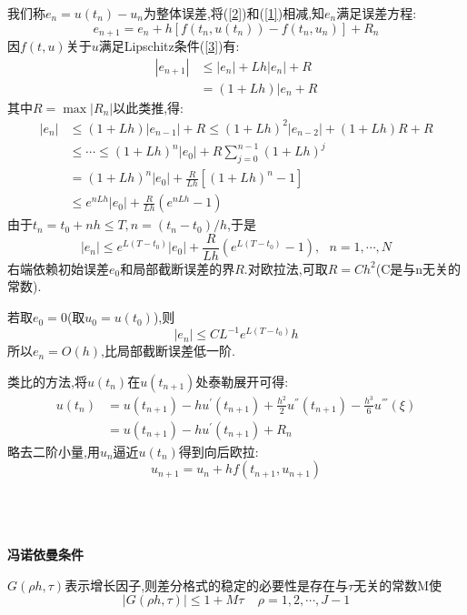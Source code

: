 \documentclass{article}
\begin{document}
\begin{CJK}{UTF8}{gkai}
我们称$e_{n}=u(t_{n})-u_{n}$为整体误差,将(\ref{2})和(\ref{1})相减,知$e_{n}$满足误差方程:
\begin{equation}
e_{n+1}=e_{n}+h[f(t_{n},u(t_{n}))-f(t_{n},u_{n})]+R_{n}
\label{3}
\end{equation}
因$f(t,u)$关于$u$满足Lipschitz条件(\ref{3})有:
\begin{align}
|e_{n+1}|&\le|e_{n}|+Lh|e_{n}|+R\\
&=(1+Lh)|e_{n}+R
\end{align}
其中$R=\max|R_{n}|$以此类推,得:
\begin{align}
|e_{n}|&\le (1+Lh)|e_{n-1}|+R\le (1+Lh)^2|e_{n-2}|+(1+Lh)R+R\\
&\le \cdots\le (1+Lh)^n|e_{0}|+R\sum_{j=0}^{n-1}(1+Lh)^j\\
&=(1+Lh)^n|e_{0}|+\frac{R}{Lh}[(1+Lh)^n-1]\\
&\le e^{nLh}|e_{0}|+\frac{R}{Lh}(e^{nLh}-1)
\end{align}
由于$t_{n}=t_{0}+nh\le T,n=(t_{n}-t_{0})/h$,于是
\begin{equation}
|e_{n}|\le e^{L(T-t_{0})}|e_{0}|+\frac{R}{Lh}(e^{L(T-t_{0})}-1),~~~n=1,\cdots,N
\end{equation}
右端依赖初始误差$e_{0}$和局部截断误差的界$R$.对欧拉法,可取$R=Ch^2$(C是与n无关的常数).

若取$e_{0}=0$(取$u_{0}=u(t_{0})$),则
\begin{equation}
|e_{n}|\le CL^{-1}e^{L(T-t_{0})}h
\end{equation}
所以$e_{n}=O(h)$,比局部截断误差低一阶.

类比的方法,将$u(t_{n})$在$u({t_{n+1}})$处泰勒展开可得:
\begin{align}
u(t_{n})&=u(t_{n+1})-hu^{'}(t_{n+1})+\frac{h^2}{2}u^{''}(t_{n+1})-\frac{h^3}{6}u^{'''}(\xi)\\&=u(t_{n+1})-hu^{'}(t_{n+1})+R_{n}
\end{align}
略去二阶小量,用$u_{n}$逼近$u(t_{n})$得到向后欧拉:
\begin{equation}
u_{n+1}=u_{n}+hf(t_{n+1},u_{n+1})
\end{equation}


\par
~\\
~\\
~\\
\textbf{冯诺依曼条件}

$G(\rho h,\tau )$表示增长因子,则差分格式的稳定的必要性是存在与$\tau$无关的常数M使
\begin{equation}
|G(\rho h,\tau )|\le 1+M\tau ~~~~~\rho=1,2,\cdots,J-1
\end{equation}


\end{CJK}
\end{document}
